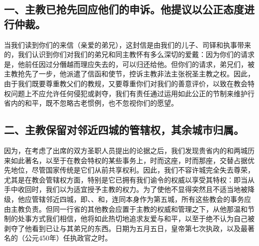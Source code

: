 \subsection{一、主教已抢先回应他们的申诉。他提议以公正态度进行仲裁。}

当我们读到你们的来信（亲爱的弟兄），这封信是由我们的儿子、司铎和执事带来的，我们认识到你们对我们的弟兄和同主教怀有多么深切的爱戴：因为你们的请求是，他前任因过分僭越而理应失去的，可以归还给他。但你们的请求，弟兄们，被主教抢先了一步，他派遣了信函和使节，控诉主教非法主张祝圣主教之权。因此，由于我们既要尊重教父们的教规，又要尊重你们对我们的善意评价，以致在教会特权问题上不应允许任何侵犯或剥夺，我们有责任通过运用如此公正的节制来维护行省内的和平，既不忽略古老惯例，也不忽视你们的愿望。\par


\subsection{二、主教保留对邻近四城的管辖权，其余城市归属。}

因为，在考虑了出席的双方圣职人员提出的论据之后，我们发现贵省内的和两城历来如此著名，以至于在教会特权的某些事务上，时而这座，时而那座，交替占据优先地位，尽管国家传统是它们从前共享权利。因此，我们不容许城完全失去尊荣，尤其是在教会管辖权方面，特别是它已拥有我们谕令的权威以享受其特权：即当从手中收回时，我们以为适宜授予主教的权力。为了使他不显得突然且不适当地被降级，他应管辖邻近四城，即、、和，连同本身作为第五城，所有这些教会的事务应由主教负责。但同一行省的其他教会应置于主教的权威和管理之下，从他那温和节制的处事方式我们相信，他将如此热切地追求友爱与和平，以至于绝不认为自己被剥夺了他看到已让与其弟兄的东西。日期为五月五日，皇帝第七次执政，以及最著名的（公元450年）任执政官之时。\par


